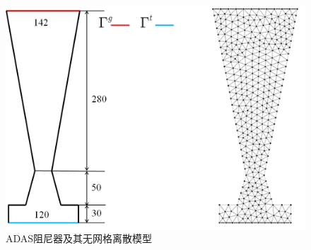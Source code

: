 \begin{figure}[H]
    \centering
    \includegraphics[scale=0.6]{figure/DAMPER/ADAS/ADAS damper_msh.png}
    \caption{ADAS阻尼器及其无网格离散模型}\label{ADASmsh}
\end{figure}
